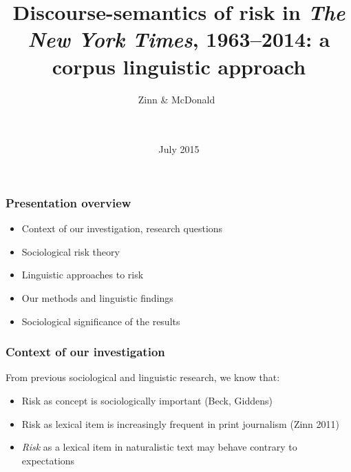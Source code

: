 \documentclass{beamer}       %
\title[ISFC Aachen 2015]{Discourse-semantics of risk in \emph{The New York Times}, 1963--2014: a corpus linguistic approach}
\author[Jens Zinn \and Daniel McDonald]{Zinn \& McDonald~\\~\\~\\\footnotesize}
\date{July 2015}
\begin{document}

\frame{\titlepage}


\begin{frame}
    \frametitle{Presentation overview}
    
    \begin{itemize}
    \item Context of our investigation, research questions
    \item Sociological risk theory
    \item Linguistic approaches to risk
    \item Our methods and linguistic findings
    \item Sociological significance of the results
    \end{itemize}
\end{frame}


\begin{frame}
    \frametitle{Context of our investigation}
    
    From previous sociological and linguistic research, we know that:

    \begin{itemize}
    \item Risk as concept is sociologically important (Beck, Giddens)
    \item Risk as lexical item is increasingly frequent in print journalism (Zinn 2011)
    \item \emph{Risk} as a lexical item in naturalistic text may behave contrary to expectations \cite{hamilton_meanings_2007}
    \end{itemize}
\end{frame}
\end{document}
